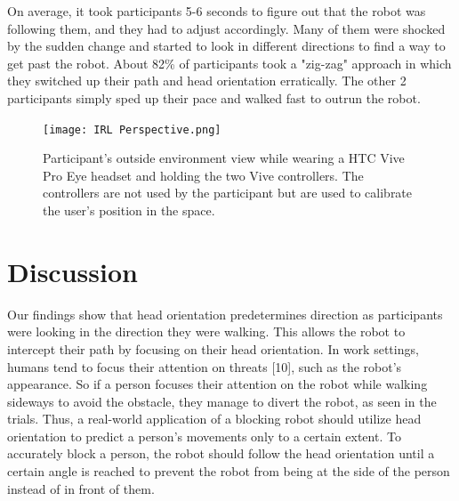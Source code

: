 \documentclass[letterpaper, 10 pt, conference]{ieeeconf}
\begin{document}
On average, it took participants 5-6 seconds to figure out that the robot was following them, and they had to adjust accordingly. Many of them were shocked by the sudden change and started to look in different directions to find a way to get past the robot. About 82\% of participants took a "zig-zag" approach in which they switched up their path and head orientation erratically. The other 2 participants simply sped up their pace and walked fast to outrun the robot. 



\addtolength{\textheight}{-12cm}   %








\begin{figure}
\centering
\texttt{[image: IRL Perspective.png]}
\caption{Participant's outside environment view while wearing a HTC Vive Pro Eye headset and holding the two Vive controllers. The controllers are not used by the participant but are used to calibrate the user's position in the space.}
\end{figure}

\section{Discussion}
Our findings show that head orientation predetermines direction as participants were looking in the direction they were walking. This allows the robot to intercept their path by focusing on their head orientation. In work settings, humans tend to focus their attention on threats [10], such as the robot's appearance. So if a person focuses their attention on the robot while walking sideways to avoid the obstacle, they manage to divert the robot, as seen in the trials. Thus, a real-world application of a blocking robot should utilize head orientation to predict a person's movements only to a certain extent. To accurately block a person, the robot should follow the head orientation until a certain angle is reached to prevent the robot from being at the side of the person instead of in front of them. 
\end{document}
